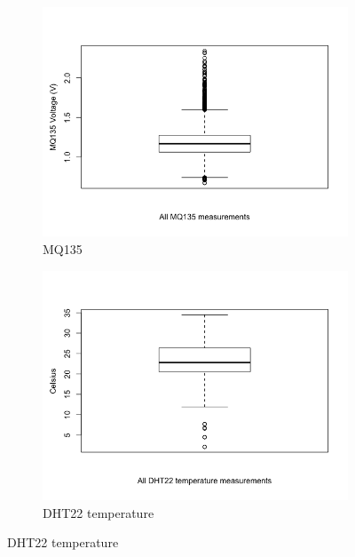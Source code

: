 \documentclass[11pt]{report}
\begin{document}
\begin{figure}[!tb]
\begin{minipage}{1\linewidth}
        \end{minipage}
    \begin{minipage}{1\linewidth}
            \begin{subfigure}[t]{.5\linewidth}
                \includegraphics[width=\textwidth]{images/mq135_boxplot}
                \caption{MQ135}
                \label{fig:pm_boxplot}
            \end{subfigure}
            \begin{subfigure}[t]{.5\linewidth}
            	\includegraphics[width=\textwidth]{images/temp_boxplot}
            	\caption{DHT22 temperature}
            	\label{fig:temp_boxplot}
	   \end{subfigure}
        \end{minipage}

\end{figure}
\end{document}
